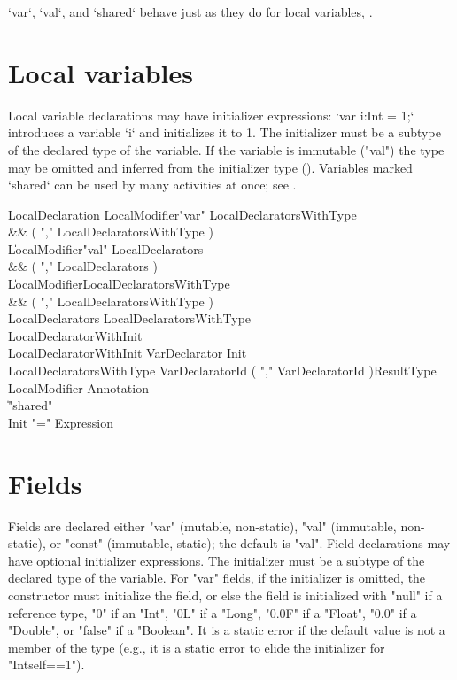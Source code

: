 \xcd`var`, \xcd`val`, and \xcd`shared` behave just as they do for local
variables, .

\section{Local variables}\label{local-variables}
Local variable declarations may have
initializer expressions: \xcd`var i:Int = 1;` introduces 
a variable \xcd`i` and initializes it to 1.
The initializer must be a subtype of
the declared type of the variable.  If the variable is immutable
(\xcd"val")
the type may be omitted and
inferred from the initializer type ().
Variables marked \xcd`shared` can be used by many activities at once; see
.

\begin{grammar}
LocalDeclaration
        \: LocalModifier\star \xcd"var" LocalDeclaratorsWithType \\&& ( \xcd"," LocalDeclaratorsWithType )\star \\
        \| LocalModifier\star \xcd"val" LocalDeclarators \\&& ( \xcd"," LocalDeclarators )\star \\
        \| LocalModifier\star LocalDeclaratorsWithType \\&& ( \xcd"," LocalDeclaratorsWithType )\star \\
LocalDeclarators
        \: LocalDeclaratorsWithType \\
        \: LocalDeclaratorWithInit \\
LocalDeclaratorWithInit
        \: VarDeclarator Init \\
LocalDeclaratorsWithType
        \: VarDeclaratorId
                ( \xcd"," VarDeclaratorId )\star ResultType \\
LocalModifier \: Annotation \\
              \| \xcd"shared" \\
Init \: \xcd"=" Expression \\
\end{grammar}

\section{Fields}
Fields are declared either \xcd"var" (mutable, non-static),
\xcd"val" (immutable, non-static), or \xcd"const" (immutable, static);
the default is \xcd"val".
Field declarations may have optional
initializer expressions.  The initializer must be a subtype of
the declared type of the variable.
For \xcd"var" fields,
if the initializer is omitted, the constructor must initialize
the field, or else the field is initialized with
\xcd"null" if a reference type, \xcd"0" if an \xcd"Int", \xcd"0L"
if a \xcd"Long",
\xcd"0.0F" if a \xcd"Float", \xcd"0.0" if a \xcd"Double", or
\xcd"false" if a \xcd"Boolean".  It is a static error if the
default value is not a member of the type (e.g., it is a static
error to elide the initializer for \xcd"Int{self==1}").

